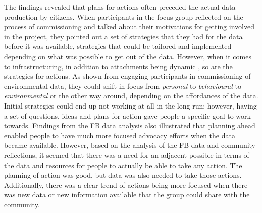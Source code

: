 The findings revealed that plans for actions often preceded the actual data production by citizens. When participants in the focus group reflected on the process of commissioning and talked about their motivations for getting involved in the project, they pointed out a set of strategies that they had for the data before it was available, strategies that could be tailored and implemented depending on what was possible to get out of the data. However, when it comes to infrastructuring, in addition to attachments being dynamic \citep{dantec_infrastructuring_2013}, so are the strategies for actions. As shown from engaging participants in commissioning of environmental data, they could shift in focus from \textit{personal} to \textit{behavioural} to \textit{environmental} or the other way around, depending on the affordances of the data. Initial strategies could end up not working at all in the long run; however, having a set of questions, ideas and plans for action gave people a specific goal to work towards. Findings from the FB data analysis also illustrated that planning ahead enabled people to have much more focused advocacy efforts when the data became available. However, based on the analysis of the FB data and community reflections, it seemed that there was a need for an adjacent possible in terms of the data and resources for people to actually be able to take any action. The planning of action was good, but data was also needed to take those actions. Additionally, there was a clear trend of actions being more focused when there was new data or new information available that the group could share with the community.

